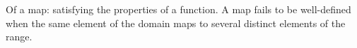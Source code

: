 Of a map: satisfying the properties of a
function.  A map fails to be well-defined when the same element
of the domain maps to several distinct elements of the range.

